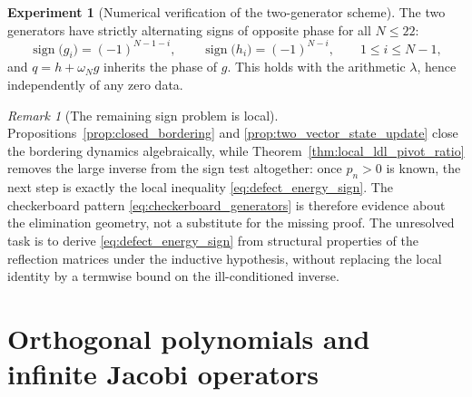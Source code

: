 \documentclass[11pt]{amsart}
\numberwithin{equation}{section}
\theoremstyle{plain}
\theoremstyle{definition}
\newtheorem{experiment}[theorem]{Experiment}
\theoremstyle{remark}
\newtheorem{remark}[theorem]{Remark}
\begin{document}
\begin{experiment}[Numerical verification of the two-generator scheme]
The two generators have strictly alternating signs of opposite phase for all $N\le22$:
\begin{equation}
 \operatorname{sign}\bigl(g_i\bigr)=(-1)^{N-1-i},
 \qquad
 \operatorname{sign}\bigl(h_i\bigr)=(-1)^{N-i},
 \qquad 1\le i\le N-1,
 \label{eq:checkerboard_generators}
\end{equation}
and $q=h+\omega_Ng$ inherits the phase of $g$.  This holds with the arithmetic $\lambda$, hence
independently of any zero data.
\end{experiment}

\begin{remark}[The remaining sign problem is local]
\label{rem:recursion_is_not_a_sign_mechanism}
Propositions~\ref{prop:closed_bordering} and \ref{prop:two_vector_state_update} close the
bordering dynamics algebraically, while Theorem~\ref{thm:local_ldl_pivot_ratio} removes the
large inverse from the sign test altogether: once $p_n>0$ is known, the next step is
exactly the local inequality \eqref{eq:defect_energy_sign}.  The checkerboard pattern
\eqref{eq:checkerboard_generators} is therefore evidence about the elimination geometry,
not a substitute for the missing proof.  The unresolved task is to derive
\eqref{eq:defect_energy_sign} from structural properties of the reflection matrices under
the inductive hypothesis, without replacing the local identity by a termwise bound on the
ill-conditioned inverse.
\end{remark}

\section{Orthogonal polynomials and infinite Jacobi operators}
\label{sec:jacobi}
\end{document}
